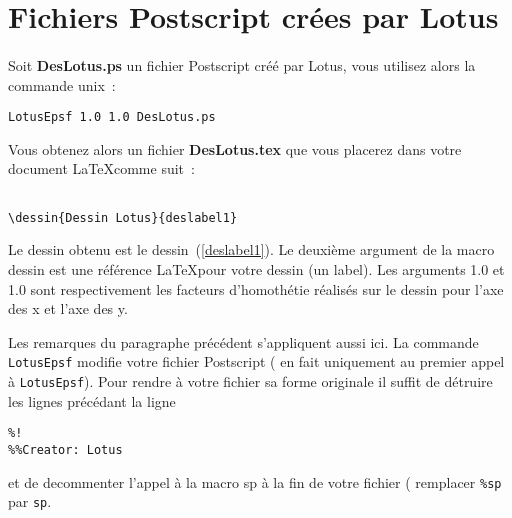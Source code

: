 \section{Fichiers Postscript cr\'ees par Lotus}

\paragraph{}Soit {\bf DesLotus.ps} un fichier Postscript cr\'e\'e par Lotus, vous utilisez alors la commande unix~:
\begin{verbatim}
LotusEpsf 1.0 1.0 DesLotus.ps
\end{verbatim}
Vous obtenez alors un fichier {\bf DesLotus.tex} que vous placerez dans votre 
document \LaTeX comme suit~:

\begin{verbatim}

\dessin{Dessin Lotus}{deslabel1}
\end{verbatim}
Le dessin obtenu est le dessin~(\ref{deslabel1}). Le deuxi\`eme argument 
 de la macro dessin est une r\'ef\'erence \LaTeX pour votre dessin (un label). Les arguments 1.0 et 1.0 sont respectivement les facteurs d'homoth\'etie r\'ealis\'es sur le dessin pour l'axe des x et l'axe des y.



Les remarques du paragraphe pr\'ec\'edent s'appliquent aussi ici. 
La commande \verb+LotusEpsf+ modifie votre fichier Postscript
 ( en fait uniquement au premier appel \`a \verb+LotusEpsf+).
 Pour rendre \`a votre fichier sa forme originale il suffit de d\'etruire les lignes pr\'ec\'edant la ligne 
\begin{verbatim} 
%!
%%Creator: Lotus
\end{verbatim}
et de decommenter l'appel \`a la macro sp \`a la fin de votre fichier (
 remplacer \verb+%sp+ par \verb+sp+.
 
